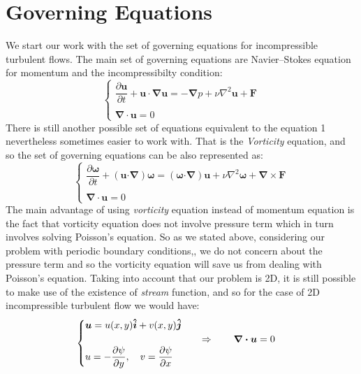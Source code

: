 \documentclass[12pt]{article}
\def\dotp{\bm{\cdot}}
\def\grad{\bm{\nabla}}
\def\div{\bm{\nabla\cdot}}
\def\curl{\bm{\nabla\times}}
\def\lap{{\nabla}^2}
\def\soo{\qquad\Rightarrow\qquad}
\def\F{\bm{F}}
\def\u{\bm{u}}
\def\OMEGA{\bm{\omega}}
\def\eI{\bm{\hat{i}}}
\def\eJ{\bm{\hat{j}}}
\begin{document}
\section{Governing Equations}
We start our work with the set of governing equations for incompressible turbulent flows. The main set of governing equations are Navier--Stokes equation for momentum and the incompressibilty condition:
%
\begin{equation}\label{Eq-1}
\begin{cases}
\dfrac{\partial \u}{\partial t} + \u\cdot\grad\u = -\grad p + \nu\lap\u + \F\\
\\
\div \u =0
\end{cases}
\end{equation}
%
There is still another possible set of equations equivalent to the equation 1 nevertheless sometimes easier to work with. That is the \emph{Vorticity} equation, and so the set of governing equations can be also represented as:
%
\begin{equation}\label{Eq-2}
\begin{cases}
\dfrac{\partial{\OMEGA}}{\partial t} + (\u\dotp\grad)\OMEGA=(\OMEGA\dotp\grad)\u + \nu\lap\OMEGA + \curl\F \\
\\
\div \u =0
\end{cases}
\end{equation}
%
The main advantage of using \emph{vorticity} equation instead of momentum equation is the fact that vorticity equation does not involve pressure term which in turn involves solving Poisson's equation. So as we stated above, considering our problem with periodic boundary conditions,, we do not concern about the pressure term and so the vorticity equation will save us from dealing with Poisson's equation. Taking into account that our problem is 2D, it is still possible to make use of the existence of \emph{stream} function, and so for the case of 2D incompressible turbulent flow we would have:
%
\begin{equation}\label{Eq-3}
\begin{cases}
\u=u(x,y)\eI+v(x,y)\eJ \\
\hspace{3.5cm}\soo \div\u=0 \\
u=-\dfrac{\partial\psi}{\partial y},\quad v=\dfrac{\partial\psi}{\partial x}
\end{cases}
\end{equation}
\end{document}
